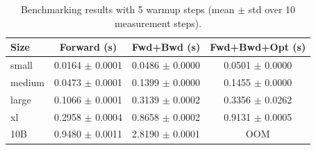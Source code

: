 \begin{table}
\caption{Benchmarking results with 5 warmup steps (mean $\pm$ std over 10 measurement steps).}
\label{tab:benchmarking_warmup5}
\begin{tabular}{lccc}
\toprule
Size & Forward (s) & Fwd+Bwd (s) & Fwd+Bwd+Opt (s) \\
\midrule
small & 0.0164 $\pm$ 0.0001 & 0.0486 $\pm$ 0.0000 & 0.0501 $\pm$ 0.0000 \\
medium & 0.0473 $\pm$ 0.0001 & 0.1399 $\pm$ 0.0000 & 0.1455 $\pm$ 0.0000 \\
large & 0.1066 $\pm$ 0.0001 & 0.3139 $\pm$ 0.0002 & 0.3356 $\pm$ 0.0262 \\
xl & 0.2958 $\pm$ 0.0004 & 0.8658 $\pm$ 0.0002 & 0.9131 $\pm$ 0.0005 \\
10B & 0.9480 $\pm$ 0.0011 & 2.8190 $\pm$ 0.0001 & OOM \\
\bottomrule
\end{tabular}
\end{table}
